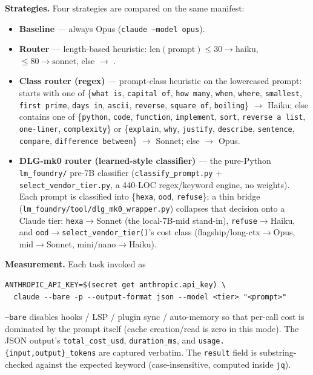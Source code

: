 \documentclass[11pt,a4paper]{article}
\begin{document}
\textbf{Strategies.} Four strategies are compared on the same manifest:
\begin{itemize}\itemsep0pt
\item \textbf{Baseline} --- always Opus
      (\texttt{claude --model opus}).
\item \textbf{Router} --- length-based heuristic:
      $\text{len}(\text{prompt}) \le 30 \to \text{haiku}$,
      $\le 80 \to \text{sonnet}$, else $\to$ .
\item \textbf{Class router (regex)} --- prompt-class heuristic on the
      lowercased prompt: starts with one of
      \{\texttt{what is}, \texttt{capital of}, \texttt{how many},
        \texttt{when}, \texttt{where}, \texttt{smallest},
        \texttt{first prime}, \texttt{days in}, \texttt{ascii},
        \texttt{reverse}, \texttt{square of}, \texttt{boiling}\}
      $\to$ Haiku; else contains one of
      \{\texttt{python}, \texttt{code}, \texttt{function},
        \texttt{implement}, \texttt{sort}, \texttt{reverse a list},
        \texttt{one-liner}, \texttt{complexity}\}
      or \{\texttt{explain}, \texttt{why}, \texttt{justify},
            \texttt{describe}, \texttt{sentence}, \texttt{compare},
            \texttt{difference between}\}
      $\to$ Sonnet; else $\to$ Opus.
\item \textbf{DLG-mk0 router (learned-style classifier)} --- the
      pure-Python \texttt{lm\_foundry/} pre-7B classifier
      (\texttt{classify\_prompt.py} + \texttt{select\_vendor\_tier.py},
      a 440-LOC regex/keyword engine, no weights). Each prompt is
      classified into \{\texttt{hexa}, \texttt{ood}, \texttt{refuse}\};
      a thin bridge
      (\texttt{lm\_foundry/tool/dlg\_mk0\_wrapper.py}) collapses that
      decision onto a Claude tier: \texttt{hexa}$\to$Sonnet (the
      local-7B-mid stand-in), \texttt{refuse}$\to$Haiku, and
      \texttt{ood}$\to$\texttt{select\_vendor\_tier()}'s cost class
      (flagship/long-ctx$\to$Opus, mid$\to$Sonnet, mini/nano$\to$Haiku).
\end{itemize}

\textbf{Measurement.} Each task invoked as
\begin{verbatim}
ANTHROPIC_API_KEY=$(secret get anthropic.api_key) \
  claude --bare -p --output-format json --model <tier> "<prompt>"
\end{verbatim}
\texttt{--bare} disables hooks / LSP / plugin sync / auto-memory so
that per-call cost is dominated by the prompt itself (cache
creation/read is zero in this mode). The JSON output's
\texttt{total\_cost\_usd}, \texttt{duration\_ms}, and
\texttt{usage.\{input,output\}\_tokens} are captured verbatim. The
\texttt{result} field is substring-checked against the expected
keyword (case-insensitive, computed inside \texttt{jq}).
\end{document}
